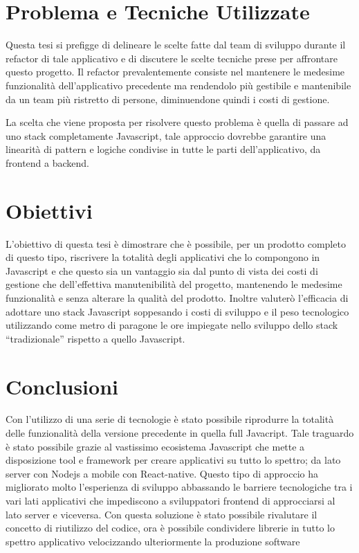 \section{Problema e Tecniche Utilizzate}\vspace{5mm}

Questa tesi si prefigge di delineare le scelte fatte dal team di sviluppo durante il refactor di tale applicativo e di discutere le scelte tecniche prese per affrontare questo progetto. Il refactor prevalentemente consiste nel mantenere le medesime funzionalità dell'applicativo precedente ma rendendolo più gestibile e mantenibile da un team più ristretto di persone, diminuendone quindi i costi di gestione.\vspace{5mm}


La scelta che viene proposta per risolvere questo problema è quella di passare ad uno stack completamente Javascript, tale approccio dovrebbe garantire una linearità di pattern e logiche condivise in tutte le parti dell'applicativo, da frontend a backend.

\section{Obiettivi}\vspace{5mm}

	L’obiettivo di questa tesi è dimostrare che è possibile, per un prodotto completo di questo tipo, riscrivere la totalità degli applicativi che lo compongono in Javascript e che questo sia un vantaggio sia dal punto di vista dei costi di gestione che dell’effettiva manutenibilità del progetto, mantenendo le medesime funzionalità e senza alterare la qualità del prodotto. Inoltre valuterò l’efficacia di adottare uno stack Javascript soppesando i costi di sviluppo e il peso tecnologico utilizzando come metro di paragone le ore impiegate nello sviluppo dello stack “tradizionale” rispetto a quello Javascript.\vspace{5mm}

\section{Conclusioni}\vspace{5mm}

Con l'utilizzo di una serie di tecnologie è stato possibile riprodurre la totalità delle funzionalità della versione precedente in quella full Javacript. Tale traguardo è stato possibile grazie al vastissimo ecosistema Javascript che mette a disposizione tool e framework per creare applicativi su tutto lo spettro; da lato server con Nodejs a mobile con React-native. Questo tipo di approccio ha migliorato molto l'esperienza di sviluppo abbassando le barriere tecnologiche tra i vari lati applicativi che impediscono a sviluppatori frontend di approcciarsi al lato server e viceversa. Con questa soluzione è stato possibile rivalutare il concetto di riutilizzo del codice, ora è possibile condividere librerie in tutto lo spettro applicativo velocizzando ulteriormente la produzione software\vspace{5mm}


